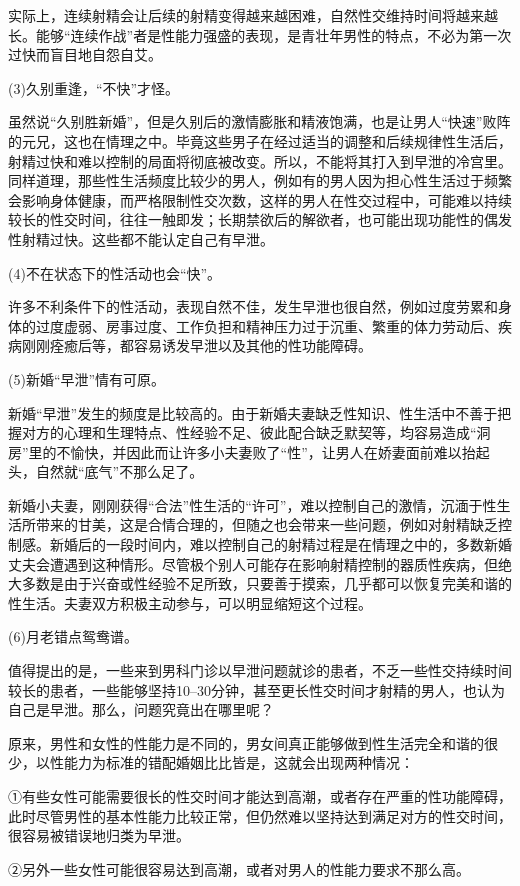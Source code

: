 \documentclass[12pt,UTF8]{ctexbook}
\begin{document}
实际上，连续射精会让后续的射精变得越来越困难，自然性交维持时间将越来越长。能够“连续作战”者是性能力强盛的表现，是青壮年男性的特点，不必为第一次过快而盲目地自怨自艾。

(3)久别重逢，“不快”才怪。

虽然说“久别胜新婚”，但是久别后的激情膨胀和精液饱满，也是让男人“快速”败阵的元兄，这也在情理之中。毕竟这些男子在经过适当的调整和后续规律性生活后，射精过快和难以控制的局面将彻底被改变。所以，不能将其打入到早泄的冷宫里。同样道理，那些性生活频度比较少的男人，例如有的男人因为担心性生活过于频繁会影响身体健康，而严格限制性交次数，这样的男人在性交过程中，可能难以持续较长的性交时间，往往一触即发；长期禁欲后的解欲者，也可能出现功能性的偶发性射精过快。这些都不能认定自己有早泄。

(4)不在状态下的性活动也会“快”。

许多不利条件下的性活动，表现自然不佳，发生早泄也很自然，例如过度劳累和身体的过度虚弱、房事过度、工作负担和精神压力过于沉重、繁重的体力劳动后、疾病刚刚痊癒后等，都容易诱发早泄以及其他的性功能障碍。

(5)新婚“早泄”情有可原。

新婚“早泄”发生的频度是比较高的。由于新婚夫妻缺乏性知识、性生活中不善于把握对方的心理和生理特点、性经验不足、彼此配合缺乏默契等，均容易造成“洞房”里的不愉快，并因此而让许多小夫妻败了“性”，让男人在娇妻面前难以抬起头，自然就“底气”不那么足了。

新婚小夫妻，刚刚获得“合法”性生活的“许可”，难以控制自己的激情，沉湎于性生活所带来的甘美，这是合情合理的，但随之也会带来一些问题，例如对射精缺乏控制感。新婚后的一段时间内，难以控制自己的射精过程是在情理之中的，多数新婚丈夫会遭遇到这种情形。尽管极个别人可能存在影响射精控制的器质性疾病，但绝大多数是由于兴奋或性经验不足所致，只要善于摸索，几乎都可以恢复完美和谐的性生活。夫妻双方积极主动参与，可以明显缩短这个过程。

(6)月老错点鸳鸯谱。

值得提出的是，一些来到男科门诊以早泄问题就诊的患者，不乏一些性交持续时间较长的患者，一些能够坚持10--30分钟，甚至更长性交时间才射精的男人，也认为自己是早泄。那么，问题究竟出在哪里呢？

原来，男性和女性的性能力是不同的，男女间真正能够做到性生活完全和谐的很少，以性能力为标准的错配婚姻比比皆是，这就会出现两种情况：

①有些女性可能需要很长的性交时间才能达到高潮，或者存在严重的性功能障碍，此时尽管男性的基本性能力比较正常，但仍然难以坚持达到满足对方的性交时间，很容易被错误地归类为早泄。

②另外一些女性可能很容易达到高潮，或者对男人的性能力要求不那么高。
\end{document}
